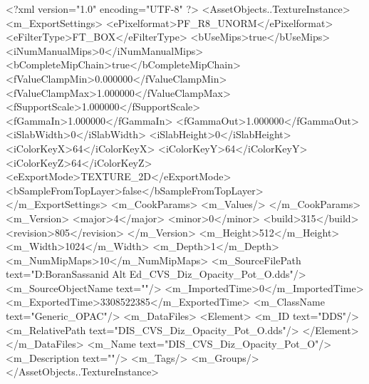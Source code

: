 <?xml version="1.0" encoding="UTF-8" ?>
<AssetObjects..TextureInstance>
	<m_ExportSettings>
		<ePixelformat>PF_R8_UNORM</ePixelformat>
		<eFilterType>FT_BOX</eFilterType>
		<bUseMips>true</bUseMips>
		<iNumManualMips>0</iNumManualMips>
		<bCompleteMipChain>true</bCompleteMipChain>
		<fValueClampMin>0.000000</fValueClampMin>
		<fValueClampMax>1.000000</fValueClampMax>
		<fSupportScale>1.000000</fSupportScale>
		<fGammaIn>1.000000</fGammaIn>
		<fGammaOut>1.000000</fGammaOut>
		<iSlabWidth>0</iSlabWidth>
		<iSlabHeight>0</iSlabHeight>
		<iColorKeyX>64</iColorKeyX>
		<iColorKeyY>64</iColorKeyY>
		<iColorKeyZ>64</iColorKeyZ>
		<eExportMode>TEXTURE_2D</eExportMode>
		<bSampleFromTopLayer>false</bSampleFromTopLayer>
	</m_ExportSettings>
	<m_CookParams>
		<m_Values/>
	</m_CookParams>
	<m_Version>
		<major>4</major>
		<minor>0</minor>
		<build>315</build>
		<revision>805</revision>
	</m_Version>
	<m_Height>512</m_Height>
	<m_Width>1024</m_Width>
	<m_Depth>1</m_Depth>
	<m_NumMipMaps>10</m_NumMipMaps>
	<m_SourceFilePath text="D:\CivVIMods\CIVITAS Boran\CIVITAS Sassanid Alt Ed\Textures\DIS_CVS_Diz_Opacity_Pot_O.dds"/>
	<m_SourceObjectName text=""/>
	<m_ImportedTime>0</m_ImportedTime>
	<m_ExportedTime>3308522385</m_ExportedTime>
	<m_ClassName text="Generic_OPAC"/>
	<m_DataFiles>
		<Element>
			<m_ID text="DDS"/>
			<m_RelativePath text="DIS_CVS_Diz_Opacity_Pot_O.dds"/>
		</Element>
	</m_DataFiles>
	<m_Name text="DIS_CVS_Diz_Opacity_Pot_O"/>
	<m_Description text=""/>
	<m_Tags/>
	<m_Groups/>
</AssetObjects..TextureInstance>

